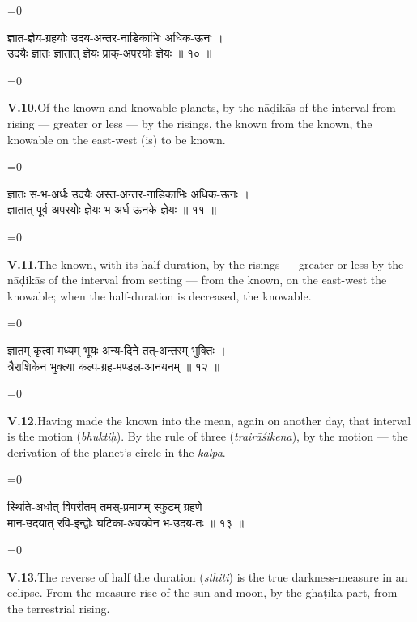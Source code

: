 \documentclass[11pt,a4paper]{article}
\newcommand{\dev}[1]{{\devanagarifont\color{sktcolor}#1}}
\newcommand{\iast}[1]{\textit{#1}}
\newenvironment{paracol}[1]{\begingroup}{\endgroup}
\newcommand{\switchcolumn}[1][]{%
  \ifnum#1=0\relax\else\par\nobreak\vspace{0.5em}\par\nobreak\fi%
}
\begin{document}
\vspace{0.3cm}

\begin{paracol}{2}
\switchcolumn[0]
\dev{%
ज्ञात-ज्ञेय-ग्रहयोः उदय-अन्तर-नाडिकाभिः अधिक-ऊनः ।\\
उदयैः ज्ञातः ज्ञातात् ज्ञेयः प्राक्-अपरयोः ज्ञेयः ॥ १० ॥
}

\switchcolumn[1]
\textbf{V.10.}\quad Of the known and knowable planets, by the
nāḍikās of the interval from rising — greater or less — by the
risings, the known from the known, the knowable on the east-west
(is) to be known.
\end{paracol}

\vspace{0.3cm}

\begin{paracol}{2}
\switchcolumn[0]
\dev{%
ज्ञातः स-भ-अर्धः उदयैः अस्त-अन्तर-नाडिकाभिः अधिक-ऊनः ।\\
ज्ञातात् पूर्व-अपरयोः ज्ञेयः भ-अर्ध-ऊनके ज्ञेयः ॥ ११ ॥
}

\switchcolumn[1]
\textbf{V.11.}\quad The known, with its half-duration, by the
risings — greater or less by the nāḍikās of the interval from
setting — from the known, on the east-west the knowable; when the
half-duration is decreased, the knowable.
\end{paracol}

\vspace{0.3cm}

\begin{paracol}{2}
\switchcolumn[0]
\dev{%
ज्ञातम् कृत्वा मध्यम् भूयः अन्य-दिने तत्-अन्तरम् भुक्तिः ।\\
त्रैराशिकेन भुक्त्या कल्प-ग्रह-मण्डल-आनयनम् ॥ १२ ॥
}

\switchcolumn[1]
\textbf{V.12.}\quad Having made the known into the mean, again on
another day, that interval is the motion (\iast{bhuktiḥ}). By
the rule of three (\iast{trairāśikena}), by the motion — the
derivation of the planet's circle in the \iast{kalpa}.
\end{paracol}

\vspace{0.3cm}

\begin{paracol}{2}
\switchcolumn[0]
\dev{%
स्थिति-अर्धात् विपरीतम् तमस्-प्रमाणम् स्फुटम् ग्रहणे ।\\
मान-उदयात् रवि-इन्द्वोः घटिका-अवयवेन भ-उदय-तः ॥ १३ ॥
}

\switchcolumn[1]
\textbf{V.13.}\quad The reverse of half the duration (\iast{sthiti})
is the true darkness-measure in an eclipse. From the measure-rise
of the sun and moon, by the ghaṭikā-part, from the terrestrial
rising.
\end{paracol}
\end{document}
